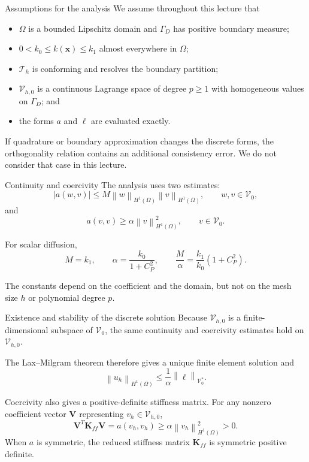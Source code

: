 \documentclass[11pt,aspectratio=169]{beamer}
\newcommand{\Om}{\Omega}
\newcommand{\Gam}{\Gamma}
\newcommand{\Th}{\mathcal T_h}
\newcommand{\Vzero}{\mathcal V_0}
\newcommand{\Vhzero}{\mathcal V_{h,0}}
\newcommand{\norm}[2][]{\left\lVert#2\right\rVert_{#1}}
\newcommand{\bx}{\bm x}
\newcommand{\bK}{\bm K}
\newcommand{\bV}{\bm V}
\begin{document}
\begin{frame}{Assumptions for the analysis}
We assume throughout this lecture that
\begin{itemize}
  \item $\Om$ is a bounded Lipschitz domain and $\Gam_D$ has positive
  boundary measure;
  \item $0<k_0\leq k(\bx)\leq k_1$ almost everywhere in $\Om$;
  \item $\Th$ is conforming and resolves the boundary partition;
  \item $\Vhzero$ is a continuous Lagrange space of degree $p\geq1$ with
  homogeneous values on $\Gam_D$; and
  \item the forms $a$ and $\ell$ are evaluated exactly.
\end{itemize}

\vspace{0.2cm}
If quadrature or boundary approximation changes the discrete forms, the
orthogonality relation contains an additional consistency error. We do not
consider that case in this lecture.
\end{frame}

\begin{frame}{Continuity and coercivity}
The analysis uses two estimates:
\[
  |a(w,v)|
  \leq M\norm[H^1(\Om)]{w}\norm[H^1(\Om)]{v},
  \qquad w,v\in\Vzero,
\]
and
\[
  a(v,v)
  \geq\alpha\norm[H^1(\Om)]{v}^2,
  \qquad v\in\Vzero.
\]

For scalar diffusion,
\[
  M=k_1,
  \qquad
  \alpha=\frac{k_0}{1+C_P^2},
  \qquad
  \frac{M}{\alpha}=\frac{k_1}{k_0}(1+C_P^2).
\]

The constants depend on the coefficient and the domain, but not on the mesh
size $h$ or polynomial degree $p$.
\end{frame}

\begin{frame}{Existence and stability of the discrete solution}
Because $\Vhzero$ is a finite-dimensional subspace of $\Vzero$, the same
continuity and coercivity estimates hold on $\Vhzero$.

The Lax--Milgram theorem therefore gives a unique finite element solution and
\[
  \norm[H^1(\Om)]{u_h}
  \leq
  \frac{1}{\alpha}\norm[\Vzero^*]{\ell}.
\]

Coercivity also gives a positive-definite stiffness matrix. For any nonzero
coefficient vector $\bV$ representing $v_h\in\Vhzero$,
\[
  \bV^T\bK_{ff}\bV
  =a(v_h,v_h)
  \geq\alpha\norm[H^1(\Om)]{v_h}^2>0.
\]
When $a$ is symmetric, the reduced stiffness matrix $\bK_{ff}$ is symmetric
positive definite.
\end{frame}
\end{document}

